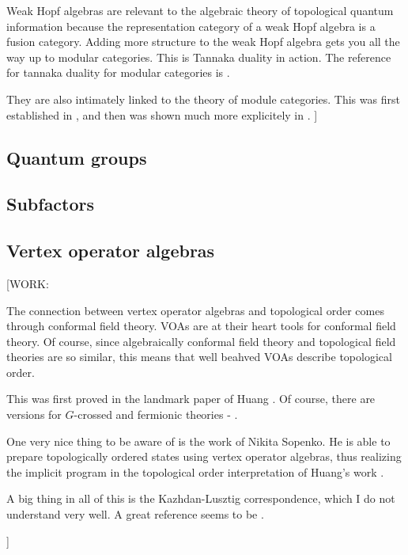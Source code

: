 Weak Hopf algebras are relevant to the algebraic theory of topological quantum information because the representation category of a weak Hopf algebra is a fusion category. Adding more structure to the weak Hopf algebra gets you all the way up to modular categories. This is Tannaka duality in action. The reference for tannaka duality for modular categories is \cite{pfeiffer2009tannaka}.

They are also intimately linked to the theory of module categories. This was first established in \cite{ostrik2003module}, and then was shown much more explicitely in \cite{kitaev2012models}.
]

\subsection{Quantum groups}

\subsection{Subfactors}

\subsection{Vertex operator algebras}

[WORK:

The connection between vertex operator algebras and topological order comes through conformal field theory. VOAs are at their heart tools for conformal field theory. Of course, since algebraically conformal field theory and topological field theories are so similar, this means that well beahved VOAs describe topological order.

This was first proved in the landmark paper of Huang \cite{huang2005vertex}. Of course, there are versions for $G$-crossed and fermionic theories - \cite{huang2021representation, carpi2023vertex}.

One very nice thing to be aware of is the work of Nikita Sopenko. He is able to prepare topologically ordered states using vertex operator algebras, thus realizing the implicit program in the topological order interpretation of Huang's work \cite{sopenko2023topological}.

A big thing in all of this is the Kazhdan-Lusztig correspondence, which I do not understand very well. A great reference seems to be \cite{tan2020vertex}.

]